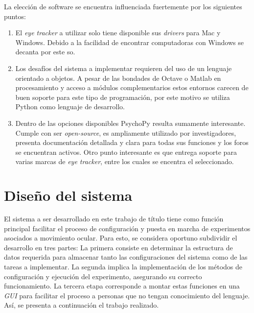 \documentclass[\main/Main.tex]{subfiles}
\begin{document}
		\newpage
		La elección de software se encuentra influenciada fuertemente por los siguientes puntos:
		\begin{enumerate}\setlength\itemsep{-0.5em}
			\item El \textit{eye tracker} a utilizar solo tiene disponible sus \textit{drivers} para Mac y Windows. Debido a la facilidad de encontrar computadoras con Windows se decanta por este \acrshort{so}.

			\item Los desafíos del sistema a implementar requieren del uso de un lenguaje orientado a objetos. A pesar de las bondades de Octave o Matlab en procesamiento y acceso a módulos complementarios estos entornos carecen de buen soporte para este tipo de programación, por este motivo se utiliza Python como lenguaje de desarrollo. 

			\item Dentro de las opciones disponibles PsychoPy resulta sumamente interesante. Cumple con ser \textit{open-source}, es ampliamente utilizado por investigadores, presenta documentación detallada y clara para todas sus funciones y los foros se encuentran activos. Otro punto interesante es que entrega soporte para varias marcas de \textit{eye tracker}, entre los cuales se encentra el seleccionado.

		\end{enumerate}

	\section{Diseño del sistema}
	\label{sec:03_diseño_sistema}
		El sistema a ser desarrollado en este trabajo de título tiene como función principal facilitar el proceso de configuración y puesta en marcha de experimentos asociados a movimiento ocular. Para esto, se considera oportuno subdividir el desarrollo en tres partes: La primera consiste en determinar la estructura de datos requerida para almacenar tanto las configuraciones del sistema como de las tareas a implementar. La segunda implica la implementación de los métodos de configuración y ejecución del experimento, asegurando su correcto funcionamiento. La tercera etapa corresponde a montar estas funciones en una \textit{GUI} para facilitar el proceso a personas que no tengan conocimiento del lenguaje. Así, se presenta a continuación el trabajo realizado.
\end{document}
